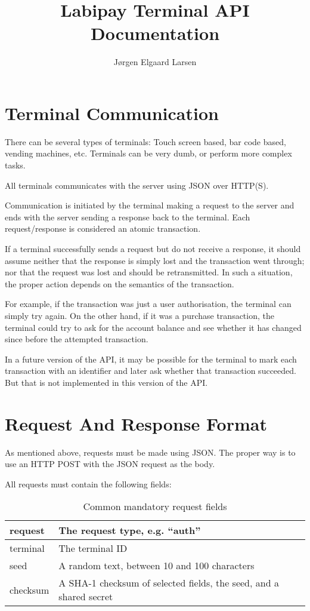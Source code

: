 \documentclass[a4paper,11pt]{article}
\title{Labipay Terminal API Documentation}
\author{Jørgen Elgaard Larsen}
\begin{document}
\maketitle

\section{Terminal Communication}
There can be several types of terminals: Touch screen based, bar code based,
vending machines, etc. Terminals can be very dumb, or perform more complex tasks. 

All terminals communicates with the server using JSON over HTTP(S). 

Communication is initiated by the terminal making a request to the
server and ends with the server sending a response back to the terminal. Each
request/response is considered an atomic transaction.

If a terminal successfully sends a request but do not receive a response, it
should assume neither that the response is simply lost and the transaction
went through; nor that the request was lost and should be
retransmitted. In such a situation, the proper action depends on the semantics
of the transaction.

For example, if the transaction was just a user authorisation, the terminal
can simply try again. On the other hand, if it was a purchase transaction, the
terminal could try to ask for the account balance and see whether it has
changed since before the attempted transaction.

In a future version of the API, it may be possible for the terminal to mark
each transaction with an identifier and later ask whether that transaction
succeeded. But that is not implemented in this version of the API.


\section{Request And Response Format}

As mentioned above, requests must be made using JSON. The proper way is to use
an HTTP POST with the JSON request as the body.

All requests must contain the following fields:

\begin{table}[!h]
  \begin{tabular}{|l|l|}
    \hline
    request & The request type, e.g. ``auth'' \\\hline
    terminal & The terminal ID \\\hline
    seed & A random text, between 10 and 100 characters \\\hline
    checksum & A SHA-1 checksum of selected fields, the seed, and a shared secret \\\hline

  \end{tabular} 
  \caption{Common mandatory request fields}
\end{table}
\end{document}
